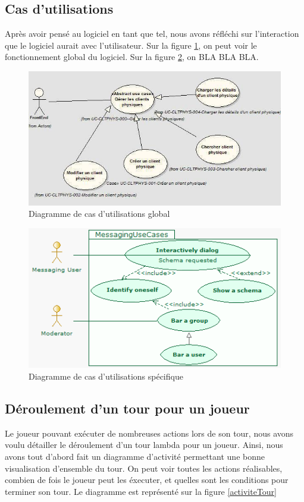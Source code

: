 \documentclass[12pt]{article}
\begin{document}
\subsection{Cas d'utilisations}
Après avoir pensé au logiciel en tant que tel, nous avons réfléchi sur l'interaction que le logiciel aurait avec l'utilisateur. Sur la figure \ref{casdut1}, on peut voir le fonctionnement global du logiciel. Sur la figure \ref{casdut2}, on BLA BLA BLA.

\begin{figure}[!h] 
\centerline{\includegraphics[scale=0.60]{diag_cas_dut_ex.jpeg}}
   \caption{\label{étiquette} Diagramme de cas d'utilisations global}
\label{casdut1}
\end{figure}

\begin{figure}[!h] 
\centerline{\includegraphics[scale=0.60]{diag_cas_dut2_ex.jpeg}}
   \caption{\label{étiquette} Diagramme de cas d'utilisations spécifique}
\label{casdut2}
\end{figure}

\subsection{Déroulement d'un tour pour un joueur}
Le joueur pouvant exécuter de nombreuses actions lors de son tour, nous avons voulu détailler le déroulement d'un tour lambda pour un joueur. Ainsi, nous avons tout d'abord fait un diagramme d'activité permettant une bonne visualisation d'ensemble du tour. On peut voir toutes les actions réalisables, combien de fois le joueur peut les éxecuter, et quelles sont les conditions pour terminer son tour. Le diagramme est représenté sur la figure \ref{activiteTour}
\end{document}
